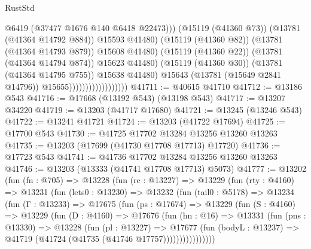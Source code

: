 \begin{lexlean}{RustStd}
\begin{coremodule}
                                                    @6419
                                                    (@37477 @1676 @140 @6418 @22473)))
                                                (@15119 (@41360 @73))
                                                (@13781 (@41364 @14792 @884))
                                                @15593
                                                @41480)
                                              (@15119 (@41360 @82))
                                              (@13781 (@41364 @14793 @879))
                                              @15608
                                              @41480)
                                            (@15119 (@41360 @22))
                                            (@13781 (@41364 @14794 @874))
                                            @15623
                                            @41480)
                                          (@15119 (@41360 @30))
                                          (@13781 (@41364 @14795 @755))
                                          @15638
                                          @41480)
                                        @15643
                                        (@13781 (@15649 @2841 @14796))
                                        @15655))))))))))))))))))
@41711 := @40615 @41710
@41712 := @13186 @543
@41716 := @17668 (@13192 @543) (@13198 @543)
@41717 := @13207 @34220
@41719 := @13203 (@41717 @17680)
@41721 := @13245 (@13246 @543)
@41722 := @13241 @41721
@41724 := @13203 (@41722 @17694)
@41725 := @17700 @543
@41730 := @41725 @17702 @13284 @13256 @13260 @13263
@41735 := @13203 (@17699 (@41730 @17708 @17713) @17720)
@41736 := @17723 @543
@41741 := @41736 @17702 @13284 @13256 @13260 @13263
@41746 := @13203 (@13333 (@41741 @17708 @17713) @5073)
@41777 := @13202
    (fun (fn : @705) =>
    @13228
      (fun (rc : @13227) =>
      @13229
        (fun (rty : @4160) =>
        @13231
          (fun (lets0 : @13230) =>
          @13232
            (fun (tail0 : @5178) =>
            @13234
              (fun (Γ : @13233) =>
              @17675
                (fun (ps : @17674) =>
                @13229
                  (fun (S : @4160) =>
                  @13229
                    (fun (D : @4160) =>
                    @17676
                      (fun (hn : @16) =>
                      @13331
                        (fun (pns : @13330) =>
                        @13228
                          (fun (pl : @13227) =>
                          @17677
                            (fun (bodyL : @13237) =>
                            @41719 (@41724 (@41735 (@41746 @17757))))))))))))))))

\end{coremodule}
\end{lexlean}
